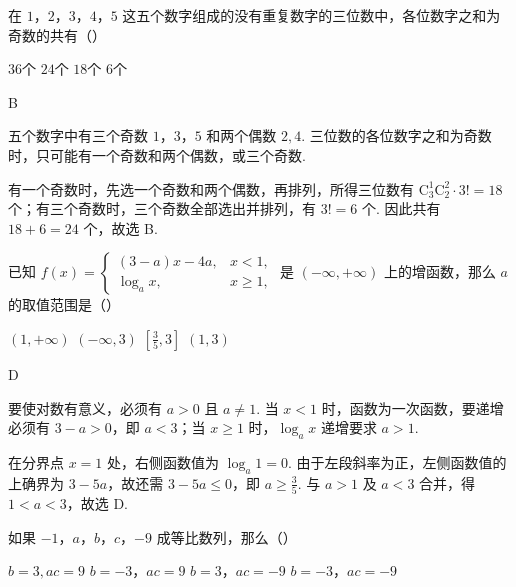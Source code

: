 \begin{problem}
在 \(1\)，\(2\)，\(3\)，\(4\)，\(5\) 这五个数字组成的没有重复数字的三位数中，各位数字之和为奇数的共有（\quad）

\choices
    {\(36\)个}
    {\(24\)个}
    {\(18\)个}
    {\(6\)个}
\end{problem}

\begin{answer}
B
\end{answer}

\begin{solution}
五个数字中有三个奇数 \(1\)，\(3\)，\(5\) 和两个偶数 \(2,4\). 三位数的各位数字之和为奇数时，只可能有一个奇数和两个偶数，或三个奇数.

有一个奇数时，先选一个奇数和两个偶数，再排列，所得三位数有 \(\mathrm C_3^1\mathrm C_2^2\cdot3!=18\) 个；有三个奇数时，三个奇数全部选出并排列，有 \(3!=6\) 个. 因此共有 \(18+6=24\) 个，故选 B.
\end{solution}

\begin{problem}
已知 \( f(x)=\begin{cases}
(3-a)x-4a,&x<1,\\
\log_{a}x,&x\geqslant1,
\end{cases} \) 是 \( (-\infty,+\infty) \) 上的增函数，那么 \(a\) 的取值范围是（\quad）

\choices
    {\((1,+\infty)\)}
    {\((-\infty,3)\)}
    {\(\left[\frac{3}{5}, 3\right]\)}
    {\((1,3)\)}
\end{problem}

\begin{answer}
D
\end{answer}

\begin{solution}
要使对数有意义，必须有 \(a>0\) 且 \(a\ne1\). 当 \(x<1\) 时，函数为一次函数，要递增必须有 \(3-a>0\)，即 \(a<3\)；当 \(x\geqslant1\) 时，\(\log_a x\) 递增要求 \(a>1\).

在分界点 \(x=1\) 处，右侧函数值为 \(\log_a1=0\). 由于左段斜率为正，左侧函数值的上确界为 \(3-5a\)，故还需 \(3-5a\leqslant0\)，即 \(a\geqslant\frac35\). 与 \(a>1\) 及 \(a<3\) 合并，得 \(1<a<3\)，故选 D.
\end{solution}

\begin{problem}
如果 \(-1\)，\(a\)，\(b\)，\(c\)，\(-9\) 成等比数列，那么（\quad）

\choices
    {\(b=3,ac=9\)}
    {\(b=-3\)，\(ac=9\)}
    {\(b=3\)，\(ac=-9\)}
    {\(b=-3\)，\(ac=-9\)}
\end{problem}

